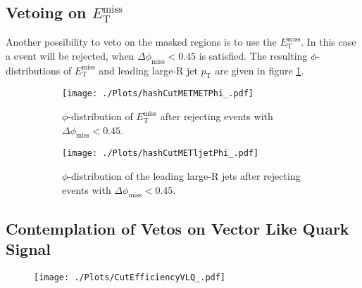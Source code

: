 \subsection{Vetoing on $E_{\mathrm{T}}^{\mathrm{miss}}$}

Another possibility to veto on the masked regions is to use the $E_{\mathrm{T}}^{\mathrm{miss}}$.
In this case a event will be rejected, when $\Delta\phi_{\mathrm{miss}} < 0.45$ is satisfied.
The resulting $\phi$-distributions of $E_{\mathrm{T}}^{\mathrm{miss}}$ and leading large-R jet $p_{\text{T}}$ are given in figure \ref{CutMET}.
\begin{figure}[H]
	\centering
	\begin{subfigure}{0.45\textwidth}
		\texttt{[image: ./Plots/hashCutMETMETPhi\_.pdf]}
		\caption{$\phi$-distribution of $E_{\mathrm{T}}^{\mathrm{miss}}$ after rejecting events with $\Delta\phi_{\mathrm{miss}} < 0.45$.}
	\end{subfigure}
	\begin{subfigure}{0.45\textwidth}
		\texttt{[image: ./Plots/hashCutMETljetPhi\_.pdf]}
		\caption{$\phi$-distribution of the leading large-R jets after rejecting events with $\Delta\phi_{\mathrm{miss}} < 0.45$.}
	\end{subfigure}
	\caption{}\label{CutMET}
\end{figure}

\subsection{Contemplation of Vetos on Vector Like Quark Signal}

\begin{figure}[H]
	\centering
	\texttt{[image: ./Plots/CutEfficiencyVLQ\_.pdf]}
	\caption{}
	\label{}
\end{figure}